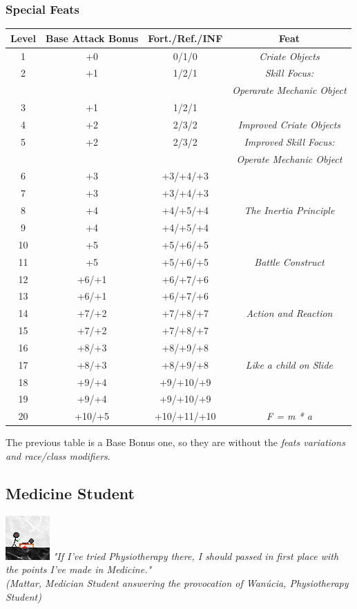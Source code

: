 \documentclass[ letterpaper,12pt]{article}
\begin{document}
\subsubsection{Special Feats}
\begin{center} \begin{tabular}{|c||c|c|c|}
\hline
{\bf Level}&{\bf Base Attack Bonus}&{\bf Fort./Ref./INF}&{\bf Feat}\\
\hline
1&+0&0/1/0&{\it Criate Objects }\\
\hline
2&+1&1/2/1&{\it Skill Focus:}\\
 & & & {\it Operarate Mechanic Object}\\
\hline
3&+1&1/2/1&\\
\hline
4&+2&2/3/2&{\it Improved Criate Objects}\\
\hline
5&+2&2/3/2&{\it Improved Skill Focus:}\\
&&&{\it Operate Mechanic Object}\\
\hline
6&+3&+3/+4/+3&\\
\hline
7&+3&+3/+4/+3&\\
\hline
8&+4&+4/+5/+4&{\it The Inertia Principle}\\
\hline
9&+4&+4/+5/+4&\\
\hline
10&+5&+5/+6/+5&\\
\hline
11&+5&+5/+6/+5&{\it Battle Construct}\\
\hline
12&+6/+1&+6/+7/+6&\\
\hline
13&+6/+1&+6/+7/+6&\\
\hline
14&+7/+2&+7/+8/+7&{\it Action and Reaction}\\
\hline
15&+7/+2&+7/+8/+7&\\
\hline
16&+8/+3&+8/+9/+8&\\
\hline
17&+8/+3&+8/+9/+8&{\it Like a child on Slide}\\
\hline
18&+9/+4&+9/+10/+9&\\
\hline
19&+9/+4&+9/+10/+9&\\
\hline
20&+10/+5&+10/+11/+10&{\it F = m * a}\\
\hline
\end{tabular} \end{center}

The previous table is a Base Bonus one, so they are without the {\it feats variations and race/class modifiers}.\\

\subsection{Medicine Student}
\includegraphics{../data/classes/Img/medicina.png}
{\it "If  I've  tried  Physiotherapy  there, I should passed  in first place with the points I've made in Medicine."\\
(Mattar, Medician  Student  answering the provocation   of  Wanúcia,  Physiotherapy Student)}\\
\end{document}
